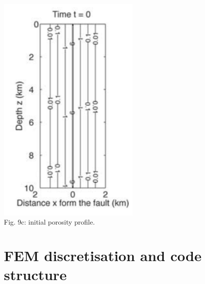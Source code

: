 \begin{center}
\includegraphics[width=7cm]{python_codes/fieldstone_126/images/grfr03b}\\
{\captionfont Fig. 9c: initial porosity profile.}
\end{center}


\newpage
\section*{FEM discretisation and code structure}

